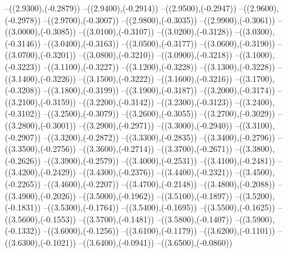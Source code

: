 {	--({\sx*(2.9300)},{\sy*(-0.2879)})
	--({\sx*(2.9400)},{\sy*(-0.2914)})
	--({\sx*(2.9500)},{\sy*(-0.2947)})
	--({\sx*(2.9600)},{\sy*(-0.2978)})
	--({\sx*(2.9700)},{\sy*(-0.3007)})
	--({\sx*(2.9800)},{\sy*(-0.3035)})
	--({\sx*(2.9900)},{\sy*(-0.3061)})
	--({\sx*(3.0000)},{\sy*(-0.3085)})
	--({\sx*(3.0100)},{\sy*(-0.3107)})
	--({\sx*(3.0200)},{\sy*(-0.3128)})
	--({\sx*(3.0300)},{\sy*(-0.3146)})
	--({\sx*(3.0400)},{\sy*(-0.3163)})
	--({\sx*(3.0500)},{\sy*(-0.3177)})
	--({\sx*(3.0600)},{\sy*(-0.3190)})
	--({\sx*(3.0700)},{\sy*(-0.3201)})
	--({\sx*(3.0800)},{\sy*(-0.3210)})
	--({\sx*(3.0900)},{\sy*(-0.3218)})
	--({\sx*(3.1000)},{\sy*(-0.3223)})
	--({\sx*(3.1100)},{\sy*(-0.3227)})
	--({\sx*(3.1200)},{\sy*(-0.3228)})
	--({\sx*(3.1300)},{\sy*(-0.3228)})
	--({\sx*(3.1400)},{\sy*(-0.3226)})
	--({\sx*(3.1500)},{\sy*(-0.3222)})
	--({\sx*(3.1600)},{\sy*(-0.3216)})
	--({\sx*(3.1700)},{\sy*(-0.3208)})
	--({\sx*(3.1800)},{\sy*(-0.3199)})
	--({\sx*(3.1900)},{\sy*(-0.3187)})
	--({\sx*(3.2000)},{\sy*(-0.3174)})
	--({\sx*(3.2100)},{\sy*(-0.3159)})
	--({\sx*(3.2200)},{\sy*(-0.3142)})
	--({\sx*(3.2300)},{\sy*(-0.3123)})
	--({\sx*(3.2400)},{\sy*(-0.3102)})
	--({\sx*(3.2500)},{\sy*(-0.3079)})
	--({\sx*(3.2600)},{\sy*(-0.3055)})
	--({\sx*(3.2700)},{\sy*(-0.3029)})
	--({\sx*(3.2800)},{\sy*(-0.3001)})
	--({\sx*(3.2900)},{\sy*(-0.2971)})
	--({\sx*(3.3000)},{\sy*(-0.2940)})
	--({\sx*(3.3100)},{\sy*(-0.2907)})
	--({\sx*(3.3200)},{\sy*(-0.2872)})
	--({\sx*(3.3300)},{\sy*(-0.2835)})
	--({\sx*(3.3400)},{\sy*(-0.2796)})
	--({\sx*(3.3500)},{\sy*(-0.2756)})
	--({\sx*(3.3600)},{\sy*(-0.2714)})
	--({\sx*(3.3700)},{\sy*(-0.2671)})
	--({\sx*(3.3800)},{\sy*(-0.2626)})
	--({\sx*(3.3900)},{\sy*(-0.2579)})
	--({\sx*(3.4000)},{\sy*(-0.2531)})
	--({\sx*(3.4100)},{\sy*(-0.2481)})
	--({\sx*(3.4200)},{\sy*(-0.2429)})
	--({\sx*(3.4300)},{\sy*(-0.2376)})
	--({\sx*(3.4400)},{\sy*(-0.2321)})
	--({\sx*(3.4500)},{\sy*(-0.2265)})
	--({\sx*(3.4600)},{\sy*(-0.2207)})
	--({\sx*(3.4700)},{\sy*(-0.2148)})
	--({\sx*(3.4800)},{\sy*(-0.2088)})
	--({\sx*(3.4900)},{\sy*(-0.2026)})
	--({\sx*(3.5000)},{\sy*(-0.1962)})
	--({\sx*(3.5100)},{\sy*(-0.1897)})
	--({\sx*(3.5200)},{\sy*(-0.1831)})
	--({\sx*(3.5300)},{\sy*(-0.1764)})
	--({\sx*(3.5400)},{\sy*(-0.1695)})
	--({\sx*(3.5500)},{\sy*(-0.1625)})
	--({\sx*(3.5600)},{\sy*(-0.1553)})
	--({\sx*(3.5700)},{\sy*(-0.1481)})
	--({\sx*(3.5800)},{\sy*(-0.1407)})
	--({\sx*(3.5900)},{\sy*(-0.1332)})
	--({\sx*(3.6000)},{\sy*(-0.1256)})
	--({\sx*(3.6100)},{\sy*(-0.1179)})
	--({\sx*(3.6200)},{\sy*(-0.1101)})
	--({\sx*(3.6300)},{\sy*(-0.1021)})
	--({\sx*(3.6400)},{\sy*(-0.0941)})
	--({\sx*(3.6500)},{\sy*(-0.0860)})
}
